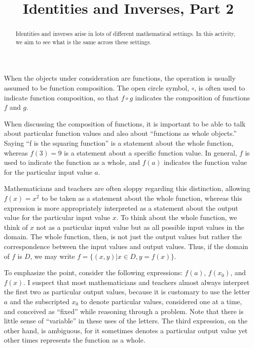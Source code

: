 \documentclass{ximera}
\title{Identities and Inverses, Part 2}
\begin{document}
\begin{abstract}
Identities and inverses arise in lots of different mathematical settings.  In this activity, we aim to see what is the same across these settings.  
\end{abstract}
\maketitle


%
%

When the objects under consideration are functions, the operation is usually assumed to be function composition.  The open circle symbol, $\circ$, is often used to indicate function composition, so that $f\circ g$  indicates the composition of functions $f$ and $g$.  

When discussing the composition of functions, it is important to be able to talk about particular function values and also about ``functions as whole objects.''  Saying ``f is the squaring function'' is a statement about the whole function, whereas $f(3) = 9$ is a statement about a specific function value.  In general, $f$ is used to indicate the function as a whole, and $f(a)$ indicates the function value for the particular input value $a$.  

Mathematicians and teachers are often sloppy regarding this distinction, allowing $f(x)=x^2$ to be taken as a statement about the whole function, whereas this expression is more appropriately interpreted as a statement about the output value for the particular input value $x$.  To think about the whole function, we think of $x$ not as a particular input value but as all possible input values in the domain.  The whole function, then, is not just the output values but rather the correspondence between the input values and output values.  Thus, if the domain of $f$ is $D$, we may write $f=\{(x,y) | x\in D, y=f(x)\}$.
  
To emphasize the point, consider the following expressions:  $f(a)$, $f(x_0)$, and $f(x)$.  I suspect that most mathematicians and teachers almost always interpret the first two as particular output values, because it is customary to use the letter $a$ and the subscripted $x_0$ to denote particular values, considered one at a time, and conceived as ``fixed'' while reasoning through a problem.  Note that there is little sense of ``variable'' in these uses of the letters.  The third expression, on the other hand, is ambiguous, for it sometimes denotes a particular output value yet other times represents the function as a whole.  
\end{document}
